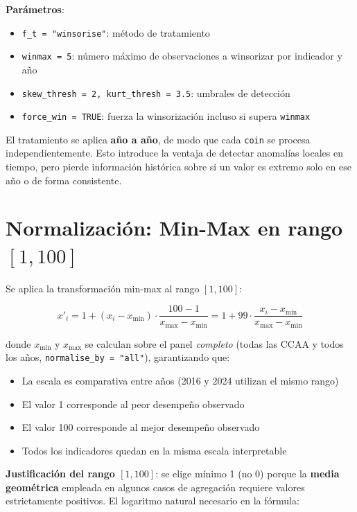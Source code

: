 \textbf{Parámetros}:
\begin{itemize}
    \item \texttt{f\_t = "winsorise"}: método de tratamiento
    \item \texttt{winmax = 5}: número máximo de observaciones a winsorizar por indicador y año
    \item \texttt{skew\_thresh = 2, kurt\_thresh = 3.5}: umbrales de detección
    \item \texttt{force\_win = TRUE}: fuerza la winsorización incluso si supera \texttt{winmax}
\end{itemize}

El tratamiento se aplica \textbf{año a año}, de modo que cada \texttt{coin} se procesa independientemente. Esto introduce la ventaja de detectar anomalías locales en tiempo, pero pierde información histórica sobre si un valor es extremo solo en ese año o de forma consistente.

\section{Normalización: Min-Max en rango $[1, 100]$}

Se aplica la transformación min-max al rango $[1, 100]$:

\begin{equation}
    x'_i = 1 + (x_i - x_{\min}) \cdot \frac{100 - 1}{x_{\max} - x_{\min}} = 1 + 99 \cdot \frac{x_i - x_{\min}}{x_{\max} - x_{\min}}
    \label{eq:minmax}
\end{equation}

donde $x_{\min}$ y $x_{\max}$ se calculan sobre el panel \emph{completo} (todas las CCAA y todos los años, \texttt{normalise\_by = "all"}), garantizando que:

\begin{itemize}
    \item La escala es comparativa entre años (2016 y 2024 utilizan el mismo rango)
    \item El valor 1 corresponde al peor desempeño observado
    \item El valor 100 corresponde al mejor desempeño observado
    \item Todos los indicadores quedan en la misma escala interpretable
\end{itemize}

\textbf{Justificación del rango $[1, 100]$}: se elige mínimo 1 (no 0) porque la \textbf{media geométrica} empleada en algunos casos de agregación requiere valores estrictamente positivos. El logaritmo natural necesario en la fórmula:

